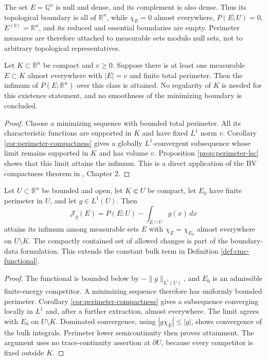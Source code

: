 \begin{example}\label{ex:null-modification-boundary}
The set $E=\mathbb Q^n$ is null and dense, and its complement is also dense. Thus its topological boundary is all of $\mathbb R^n$, while $\chi_E=0$ almost everywhere, $P(E;U)=0$, $E^{(0)}=\mathbb R^n$, and its reduced and essential boundaries are empty. Perimeter measures are therefore attached to measurable sets modulo null sets, not to arbitrary topological representatives.
\end{example}

\begin{proposition}\label{prop:perimeter-volume-existence}
Let $K\subset\mathbb R^n$ be compact and $v\geq0$. Suppose there is at least one measurable $E\subset K$ almost everywhere with $|E|=v$ and finite total perimeter. Then the infimum of $P(E;\mathbb R^n)$ over this class is attained. No regularity of $K$ is needed for this existence statement, and no smoothness of the minimizing boundary is concluded.
\end{proposition}
\begin{proof}
Choose a minimizing sequence with bounded total perimeter. All its characteristic functions are supported in $K$ and have fixed $L^1$ norm $v$. Corollary \ref{cor:perimeter-compactness} gives a globally $L^1$-convergent subsequence whose limit remains supported in $K$ and has volume $v$. Proposition \ref{prop:perimeter-lsc} shows that this limit attains the infimum. This is a direct application of the BV compactness theorem in \cite{Sim18}, Chapter 2.
\end{proof}

\begin{proposition}\label{prop:perimeter-bulk-existence}
Let $U\subset\mathbb R^n$ be bounded and open, let $K\Subset U$ be compact, let $E_0$ have finite perimeter in $U$, and let $g\in L^1(U)$. Then
\[
 \mathcal J_g(E)=P(E;U)-\int_{E\cap U}g(x)\,dx
\]
attains its infimum among measurable sets $E$ with $\chi_E=\chi_{E_0}$ almost everywhere on $U\setminus K$. The compactly contained set of allowed changes is part of the boundary-data formulation. This extends the constant bulk term in Definition \ref{def:cmc-functional}.
\end{proposition}
\begin{proof}
The functional is bounded below by $-\|g\|_{L^1(U)}$, and $E_0$ is an admissible finite-energy competitor. A minimizing sequence therefore has uniformly bounded perimeter. Corollary \ref{cor:perimeter-compactness} gives a subsequence converging locally in $L^1$ and, after a further extraction, almost everywhere. The limit agrees with $E_0$ on $U\setminus K$. Dominated convergence, using $|g\chi_E|\leq|g|$, shows convergence of the bulk integrals. Perimeter lower semicontinuity then proves attainment. The argument uses no trace-continuity assertion at $\partial U$, because every competitor is fixed outside $K$.
\end{proof}


